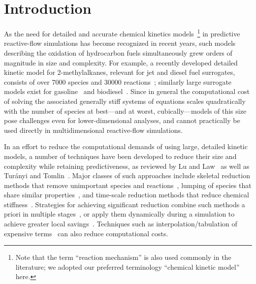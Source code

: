 \documentclass[preprint,12pt]{elsarticle}
\begin{document}
\listoftodos{}

\section{Introduction}
\label{sec:intro}

As the need for detailed and accurate chemical kinetics models~\footnote{Note that the term ``reaction mechanism'' is also used commonly in the literature; we adopted our preferred terminology ``chemical kinetic model'' here.} in predictive reactive-flow simulations has become recognized in recent years, such models describing the oxidation of hydrocarbon fuels simultaneously grew orders of magnitude in size and complexity.
For example, a recently developed detailed kinetic model for 2-methylalkanes, relevant for jet and diesel fuel surrogates, consists of over 7000 species and 30000 reactions~\cite{Sarathy:2011kx}; similarly large surrogate models exist for gasoline~\cite{Mehl:2011cn,Mehl:2011jn} and biodiesel~\cite{Herbinet:2010gu}.
Since in general the computational cost of solving the associated generally stiff systems of equations scales quadratically with the number of species at best---and at worst, cubically---models of this size pose challenges even for lower-dimensional analyses, and cannot practically be used directly in multidimensional reactive-flow simulations.

In an effort to reduce the computational demands of using large, detailed kinetic models, a number of techniques have been developed to reduce their size and complexity while retaining predictiveness, as reviewed by Lu and Law~\cite{Lu:2009gh} as well as Tur{\'a}nyi and Tomlin~\cite{Turanyi:2014aa}.
Major classes of such approaches include skeletal reduction methods that remove unimportant species and reactions~\cite{Lu:2006bb,Pepiot-Desjardins:2008,Hiremath:2010jw,Niemeyer:2010bt}, lumping of species that share similar properties~\cite{Lu:2007,Ahmed:2007fa,Pepiot:2008kq}, and time-scale reduction methods that reduce chemical stiffness~\cite{Maas:1992ws,Lam:1994ws,Lu:2001ve,Gou:2010}.
Strategies for achieving significant reduction combine such methods a priori in multiple stages~\cite{Lu:2008bi,Niemeyer:2014,Niemeyer:2015wq}, or apply them dynamically during a simulation to achieve greater local savings~\cite{Banerjee:2006,Liang:2009,Shi:2010,Gou:2013eu,Yang:2013ip,Curtis:2015aa}.
Techniques such as interpolation\slash tabulation of expensive terms~\cite{Pope:1997wu} can also reduce computational costs.
\end{document}
